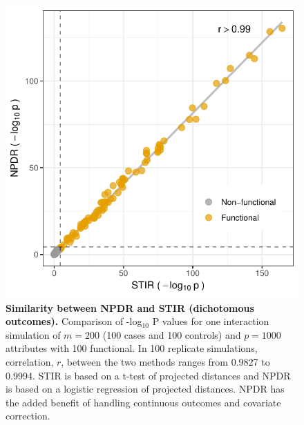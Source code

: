 \documentclass{article}
\begin{document}
\begin{figure}[h]%
\centerline{\includegraphics[]{../figs/npdr_stir_p_cc.pdf}}
\caption{\textbf{Similarity between NPDR and STIR (dichotomous outcomes).} Comparison of -log$_{10}$ P values for one interaction simulation of $m = 200$ (100 cases and 100 controls) and $p = 1000$ attributes with 100 functional. In 100 replicate simulations, correlation,  $r$, between the two methods ranges from 0.9827 to 0.9994. STIR is based on a t-test of projected distances and NPDR is based on a logistic regression of projected distances. NPDR has the added benefit of handling continuous outcomes and covariate correction.}
\label{fig:npdr_stir}
\end{figure}

\end{document}
